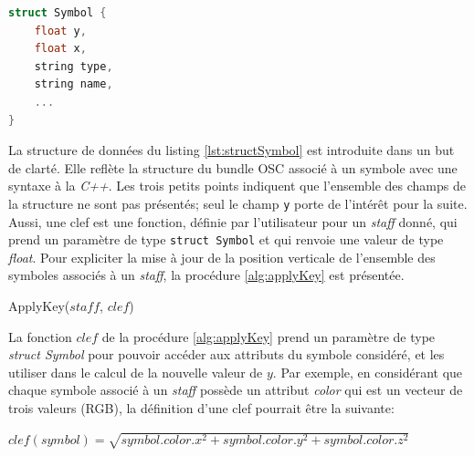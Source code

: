 \begin{lstlisting}[language=C++,
				   caption={Structure de donn\'{e}es pour un symbole}, 
				   label={lst:structSymbol}, 
				   captionpos={b}, 
				   numbers=none]
struct Symbol {
	float y,
	float x,
	string type,
	string name,
	...
}
\end{lstlisting}

La structure de données du listing \ref{lst:structSymbol} est introduite dans un but de clarté. Elle reflète la structure du bundle OSC associé à un symbole avec une syntaxe à la \textit{C++}. Les trois petits points indiquent que l'ensemble des champs de la structure ne sont pas présentés; seul le champ \lstinline|y| porte de l'intérêt pour la suite.  
Aussi, une clef est une fonction, définie par l'utilisateur pour un \textit{staff} donné, qui prend un paramètre de type \texttt{struct Symbol} et qui renvoie une valeur de type \textit{float}.
Pour expliciter la mise à jour de la position verticale de l'ensemble des symboles associés à un \textit{staff}, la procédure \ref{alg:applyKey} est présentée.


\begin{procedure}[H]
	\caption{ApplyKey($staff$, $clef$)}
	\label{alg:applyKey}
    
     
	
    \DontPrintSemicolon
    \BlankLine
    
	
\end{procedure}

La fonction $clef$ de la procédure \ref{alg:applyKey} prend un paramètre de type \textit{struct Symbol} 
pour pouvoir accéder aux attributs du symbole considéré, et les utiliser dans le calcul de la nouvelle valeur de $y$.
Par exemple, en considérant que chaque symbole associé à un \textit{staff} possède un attribut \textit{color} qui est un vecteur de trois valeurs (RGB), la définition d'une clef pourrait être la suivante:
\begin{center}
	$clef(symbol) = \sqrt{symbol.color.x^2 + symbol.color.y^2 + symbol.color.z^2} $
\end{center}

